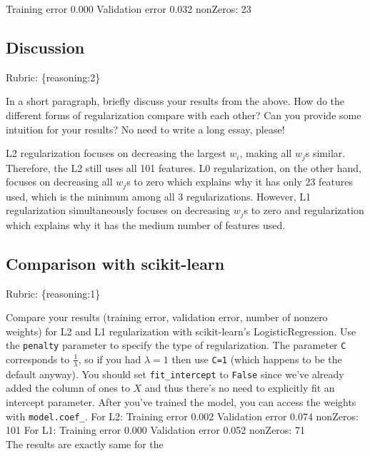 \documentclass{article}
\def\rubric#1{\gre{Rubric: \{#1\}}}{}
\def\gre#1{{\color{gre}#1}}
\def\red#1{{\color{red}#1}}
\begin{document}
\red{
Training error 0.000 \newline
Validation error 0.032 \newline
nonZeros: 23
}

\subsection{Discussion}
\rubric{reasoning:2}

In a short paragraph, briefly discuss your results from the above. How do the
different forms of regularization compare with each other?
Can you provide some intuition for your results? No need to write a long essay, please!

\red{L2 regularization focuses on decreasing the largest $w_{i}$, making all $w_{j}$s similar. Therefore, the L2 still uses all 101 features. L0 regularization, on the other hand, focuses on decreasing all $w_{j}$s to zero which explains why it has only 23 features used, which is the minimum among all 3 regularizations. However, L1 regularization simultaneously focuses on decreasing $w_{j}$s to zero and regularization which explains why it has the medium number of features used.}

\subsection{Comparison with scikit-learn}
\rubric{reasoning:1}

Compare your results (training error, validation error, number of nonzero weights) for L2 and L1 regularization with scikit-learn's LogisticRegression. Use the
\texttt{penalty} parameter to specify the type of regularization. The parameter \texttt{C} corresponds to $\frac{1}{\lambda}$, so if
you had $\lambda=1$ then use \texttt{C=1} (which happens to be the default anyway).
You should set \texttt{fit\string_intercept} to \texttt{False} since we've already added the column of ones to $X$ and thus
there's no need to explicitly fit an intercept parameter. After you've trained the model, you can access the weights
with \texttt{model.coef\string_}.
\red{
\newline For L2: \newline
Training error 0.002\newline
Validation error 0.074\newline
nonZeros: 101\newline\newline
For L1: \newline
Training error 0.000\newline
Validation error 0.052\newline
nonZeros: 71 \\
The results are exactly same for the }
\end{document}
